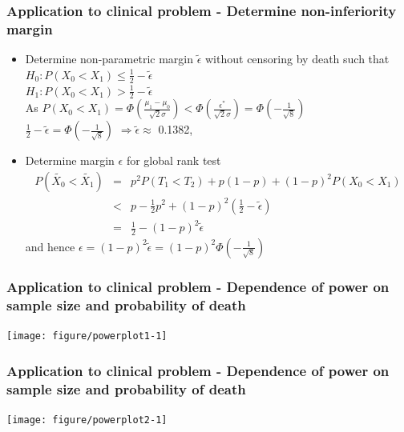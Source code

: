 \documentclass[xcolor=pdftex,dvipsnames,table]{beamer}\usepackage[]{graphicx}\usepackage[]{color}
\newenvironment{knitrout}{}{} %
\begin{document}
\begin{frame}[label = slide11,fragile] %
\frametitle{Application to clinical problem - Determine non-inferiority margin}
\begin{itemize}
\item Determine non-parametric margin $\tilde{\epsilon}$ without censoring by death such that\\
        $H_0: P(X_0 < X_1) \leq \frac{1}{2} - \tilde{\epsilon}$ \\
        $H_1: P(X_0 < X_1) > \frac{1}{2} - \tilde{\epsilon}$ \\
        As $P(X_0 < X_1) = \Phi(\frac{\mu_1 - \mu_0}{\sqrt{2}\sigma}) < \Phi(\frac{\epsilon^{*}}{\sqrt{2}\sigma}) = \Phi(-\frac{1}{\sqrt{8}}) $ \\
      $\frac{1}{2} - \tilde{\epsilon} = \Phi(-\frac{1}{\sqrt{8}}) $ 
      $\Rightarrow \tilde{\epsilon} \approx $ 0.1382, \item Determine margin $\epsilon$ for global rank test
\begin{eqnarray*}
P(\tilde{X_0}  < \tilde{X_1}) & = & p^2 P(T_1 < T_2) + p(1-p) + (1 - p)^2 P(X_0 < X_1) \\
& < & p - \frac{1}{2}p^2 + (1-p)^2 (\frac{1}{2} - \tilde{\epsilon}) \\
& = & \frac{1}{2} - (1-p)^2 \tilde{\epsilon}
\end{eqnarray*}
and hence $\epsilon = (1-p)^2 \tilde{\epsilon} = (1-p)^2 \Phi(-\frac{1}{\sqrt{8}})$
\end{itemize}
\end{frame}


\begin{frame}[label=slide12,fragile] %
\frametitle{Application to clinical problem - Dependence of power on sample size and probability of death}
\begin{knitrout}
\color{fgcolor}
\texttt{[image: figure/powerplot1-1]} 

\end{knitrout}
\end{frame}

\begin{frame}[label=slide12,fragile] %
\frametitle{Application to clinical problem - Dependence of power on sample size and probability of death}
\begin{knitrout}
\color{fgcolor}
\texttt{[image: figure/powerplot2-1]} 

\end{knitrout}
\end{frame}
\end{document}
